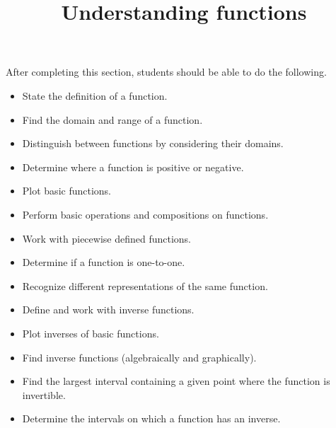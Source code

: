 \documentclass{ximera}
\title{Understanding functions}
\begin{document}
\begin{abstract}
\end{abstract}
 
\maketitle
 
\begin{sectionOutcomes}
After completing this section, students should be able to do the following.
 
\begin{itemize}
    \item State the definition of a function.
    \item Find the domain and range of a function.
    \item Distinguish between functions by considering their domains.
    \item Determine where a function is positive or negative.
    \item Plot basic functions.
        \item Perform basic operations and compositions on
          functions.
        \item Work with piecewise defined functions.
    \item Determine if a function is one-to-one.
    \item Recognize different representations of the same function.
        \item Define and work with inverse functions.
        \item Plot inverses of basic functions.
    \item Find inverse functions (algebraically and graphically).
        \item Find the largest interval containing a given point
          where the function is invertible.
    \item Determine the intervals on which a function has an inverse.
 
\end{itemize}
\end{sectionOutcomes}
 
\end{document}
